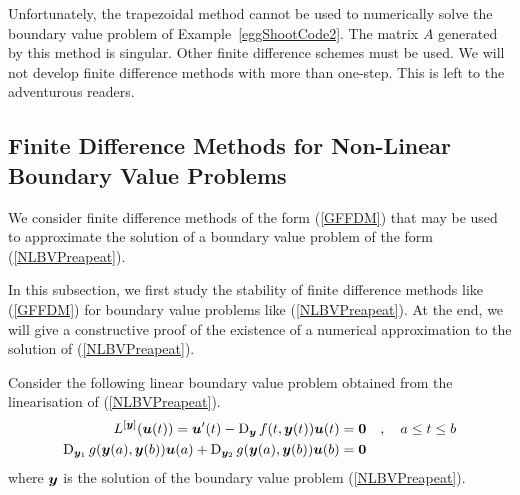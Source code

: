 Unfortunately, the trapezoidal method cannot be used to numerically
solve the boundary value problem of Example~\ref{eggShootCode2}.  The
matrix $A$ generated by this method is singular.  Other finite
difference schemes must be used.  We will not develop finite difference
methods with more than one-step.  This is left to the adventurous
readers.

\subsection{Finite Difference Methods for Non-Linear Boundary Value
Problems}

We consider finite difference methods of the form (\ref{GFFDM}) that
may be used to approximate the solution of a boundary value problem of
the form (\ref{NLBVPreapeat}).

In this subsection, we first study the stability of finite difference
methods like (\ref{GFFDM}) for boundary value problems like
(\ref{NLBVPreapeat}).  At the end, we will give a constructive proof
of the existence of a numerical approximation to the solution of
(\ref{NLBVPreapeat}).

Consider the following linear boundary value problem obtained from the
linearisation of (\ref{NLBVPreapeat}).
\begin{equation} \label{LinGBVP}
\begin{split}
L^{[\bm{y}]}(\bm{u}(t)) = \bm{u}'(t) -
\operatorname{D}_{\bm{y}}f(t,\bm{y}(t)) \bm{u}(t) &= \bm{0} \quad , \quad
a \leq t \leq b  \\
\operatorname{D}_{\bm{y}_1} g(\bm{y}(a),\bm{y}(b)) \bm{u}(a) +
\operatorname{D}_{\bm{y}_2} g(\bm{y}(a),\bm{y}(b)) \bm{u}(b) &= \bm{0}
\end{split}
\end{equation}
where $\bm{y}$ is the solution of the boundary value problem
(\ref{NLBVPreapeat}).

